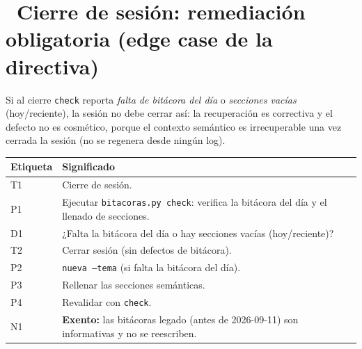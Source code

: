 \documentclass[11pt,a4paper]{article}
\newcommand{\iconotexto}[2]{\textcolor{cyanNeon}{\faIcon{#1}}~#2}
\begin{document}
\section{\iconotexto{door-closed}{Cierre de sesión: remediación obligatoria (edge case de la directiva)}}

Si al cierre \texttt{check} reporta \emph{falta de bitácora del día} o \emph{secciones
vacías} (hoy/reciente), la sesión no debe cerrar así: la recuperación es correctiva y el
defecto no es cosmético, porque el contexto semántico es irrecuperable una vez cerrada la
sesión (no se regenera desde ningún log).

\begin{center}

\vspace{6pt}
\begin{tcolorbox}[cajaContenido, title={\faIcon{table}~Leyenda de etiquetas}]
\small
\begin{tabularx}{\linewidth}{@{}>{\centering\arraybackslash}p{1.4cm}X@{}}
\toprule
\textbf{Etiqueta} & \textbf{Significado} \\ \midrule
T1 & Cierre de sesión. \\
P1 & Ejecutar \texttt{bitacoras.py check}: verifica la bitácora del día y el llenado de secciones. \\
D1 & ¿Falta la bitácora del día o hay secciones vacías (hoy/reciente)? \\
T2 & Cerrar sesión (sin defectos de bitácora). \\
P2 & \texttt{nueva --tema} (si falta la bitácora del día). \\
P3 & Rellenar las secciones semánticas. \\
P4 & Revalidar con \texttt{check}. \\
N1 & \textbf{Exento:} las bitácoras legado (antes de 2026-09-11) son informativas y no se reescriben. \\
\bottomrule
\end{tabularx}
\end{tcolorbox}
\end{center}
\end{document}
